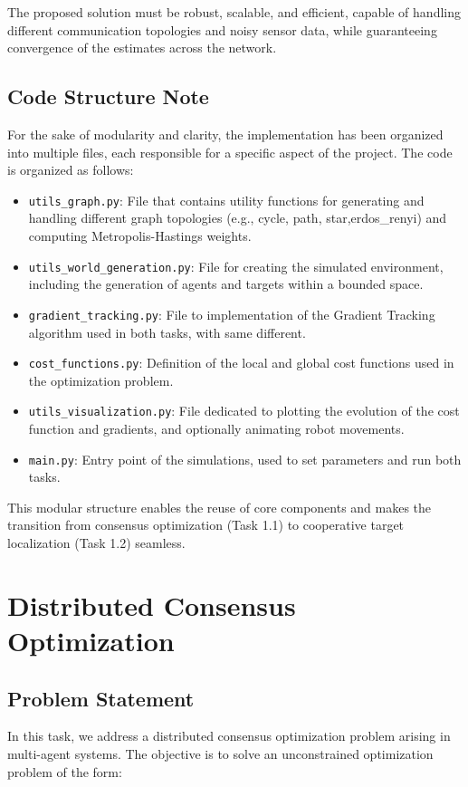 The proposed solution must be robust, scalable, and efficient, capable of handling different communication topologies and noisy sensor data, while guaranteeing convergence of the 
estimates across the network.

\subsection*{Code Structure Note}

For the sake of modularity and clarity, the implementation has been organized into multiple files, each responsible for a specific aspect of the project. The code is organized as 
follows:

\begin{itemize}
    \item \texttt{utils\_graph.py}: File that contains utility functions for generating and handling different graph topologies (e.g., cycle, path, star,erdos\_renyi) and computing 
    Metropolis-Hastings weights.
    \item \texttt{utils\_world\_generation.py}: File for creating the simulated environment, including the generation of agents and targets within a bounded space.
    \item \texttt{gradient\_tracking.py}: File to implementation of the Gradient Tracking algorithm used in both tasks, with same different.
    \item \texttt{cost\_functions.py}: Definition of the local and global cost functions used in the optimization problem.
    \item \texttt{utils\_visualization.py}: File dedicated to plotting the evolution of the cost function and gradients, and optionally animating robot movements.
    \item \texttt{main.py}: Entry point of the simulations, used to set parameters and run both tasks.
\end{itemize}

This modular structure enables the reuse of core components and makes the transition from consensus optimization (Task 1.1) to cooperative target localization (Task 1.2) seamless.



\section{Distributed Consensus Optimization}

\subsection{Problem Statement}
In this task, we address a distributed consensus optimization problem arising in multi-agent systems. The objective is to solve an unconstrained optimization problem of the form:

